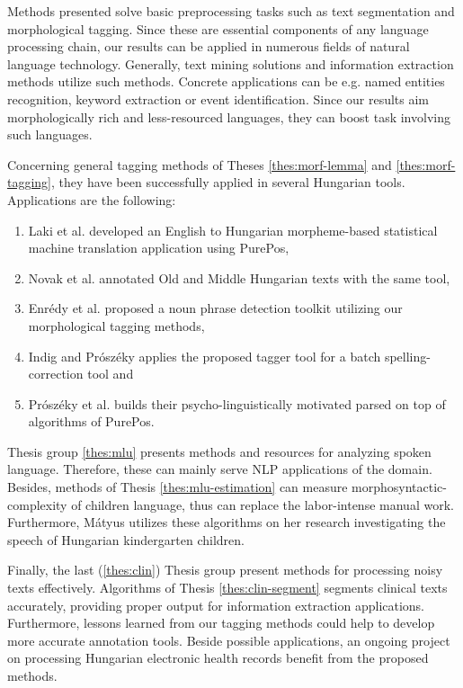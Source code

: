 
Methods presented solve basic preprocessing tasks such as text segmentation and morphological tagging. 
Since these are essential components of any language processing chain, our results can be applied in numerous fields of natural language technology. 
Generally, text mining solutions and information extraction methods utilize such methods.
Concrete applications can be e.g. named entities recognition, keyword extraction or event identification. 
Since our results aim morphologically rich and less-resourced languages, they can boost task involving such languages.

Concerning general tagging methods of Theses \ref{thes:morf-lemma} and \ref{thes:morf-tagging}, they have been successfully applied in several Hungarian tools.
Applications are the following:
\begin{enumerate}
\item Laki et al. \cite{Laki2013} developed an English to Hungarian morpheme-based statistical machine translation application using PurePos,
\item Novak et al. \cite{Novak2013} annotated Old and Middle Hungarian texts with the same tool,
\item Enrédy et al. \cite{Endredy2014} proposed a noun phrase detection toolkit utilizing our morphological tagging methods,
\item Indig and Prószéky applies \cite{Indig2013} the proposed tagger tool for a batch spelling-correction tool and
\item Prószéky et al. \cite{Proszeky2014} builds their psycho-linguistically motivated parsed on top of algorithms of PurePos.
\end{enumerate}

Thesis group \ref{thes:mlu} presents methods and resources for analyzing spoken language.
Therefore, these can mainly serve NLP applications of the domain.
Besides, methods of Thesis \ref{thes:mlu-estimation} can measure morphosyntactic-complexity of children language, thus can replace the labor-intense manual work.
Furthermore, Mátyus utilizes \cite{Matyus2014b} these algorithms on her research investigating the speech of Hungarian kindergarten children.

Finally, the last (\ref{thes:clin}) Thesis group present methods for processing noisy texts effectively.
Algorithms of Thesis \ref{thes:clin-segment} segments clinical texts accurately, providing proper output for information extraction applications. 
Furthermore, lessons learned from our tagging methods could help to develop more accurate annotation tools.
Beside possible applications, an ongoing project \cite{Siklosi2014,Siklosi2014mszny} on processing Hungarian electronic health records benefit from the proposed methods.


